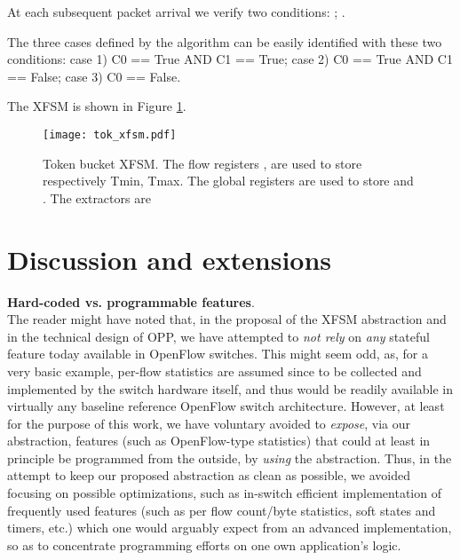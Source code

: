 \documentclass{sig-alternate}
\begin{document}
At each subsequent packet arrival we verify two conditions: ; .

The three cases defined by the algorithm can be easily identified with these two conditions: case 1) C0 == True AND C1 == True; case 2) C0 == True AND C1 == False; case 3) C0 == False.

The XFSM is shown in Figure \ref{fig:tok_xfsm}. 

\begin{figure}[t]
	\centering
	\texttt{[image: tok\_xfsm.pdf]} 
\vspace{-1.2em}
	\caption{Token bucket XFSM. The flow registers ,  are used to store respectively Tmin, Tmax. The global registers  are used to store  and . The extractors are }
	         	  \vspace{-1.5em}
	\label{fig:tok_xfsm}
\end{figure}



\section{Discussion and extensions}
\label{s:disc}

\noindent \textbf{Hard-coded vs. programmable features}. \\
The reader might have noted that, in the proposal of the XFSM abstraction and in the technical design of OPP, we have attempted to {\em not rely} on {\em any} stateful feature today available in OpenFlow switches. This might seem odd, as, for a very basic example, per-flow statistics are assumed since \cite{OF08} to be collected and implemented by the switch hardware itself, and thus would be readily available in virtually any baseline reference OpenFlow switch architecture. However, at least for the purpose of this work, we have voluntary avoided to {\em expose}, via our abstraction, features (such as OpenFlow-type statistics) that could at least in principle be programmed from the outside, by {\em using} the abstraction.  Thus, in the attempt to keep our proposed abstraction as clean as possible, we avoided focusing on possible optimizations, such as in-switch efficient implementation of frequently used features (such as per flow count/byte statistics, soft states and timers, etc.) which one would arguably expect from an advanced implementation, so as to concentrate programming efforts on one own application's logic. 
\end{document}
